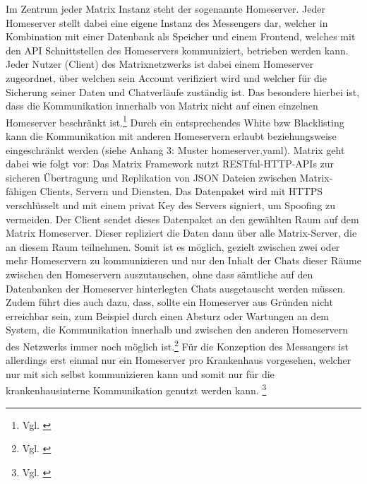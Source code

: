 Im Zentrum jeder Matrix Instanz steht der sogenannte Homeserver. Jeder Homeserver stellt dabei eine eigene Instanz des Messengers dar, welcher in Kombination mit einer Datenbank als Speicher und einem Frontend, welches mit den API Schnittstellen des Homeservers kommuniziert, betrieben werden kann. Jeder Nutzer (Client) des Matrixnetzwerks ist dabei einem Homeserver zugeordnet, über welchen sein Account verifiziert wird und welcher für die Sicherung seiner Daten und Chatverläufe zuständig ist. Das besondere hierbei ist, dass die Kommunikation innerhalb von Matrix nicht auf einen einzelnen Homeserver beschränkt ist.\footnote{Vgl. \cite{Github2020}} Durch ein entsprechendes White bzw Blacklisting kann die Kommunikation mit anderen Homeservern erlaubt beziehungsweise eingeschränkt werden (siehe Anhang 3: Muster homeserver.yaml). Matrix geht dabei wie folgt vor:
Das Matrix Framework nutzt RESTful-HTTP-APIs zur sicheren Übertragung und Replikation von JSON Dateien zwischen Matrix-fähigen Clients, Servern und Diensten. Das Datenpaket wird mit HTTPS verschlüsselt und mit einem privat Key des Servers signiert, um Spoofing zu vermeiden.
Der Client sendet dieses Datenpaket an den gewählten \glqq Raum\grqq{} auf dem Matrix Homeserver. Dieser repliziert die Daten dann über alle Matrix-Server, die an diesem \glqq Raum\grqq{} teilnehmen. Somit ist es möglich, gezielt zwischen zwei oder mehr Homeservern zu kommunizieren und nur den Inhalt der Chats dieser Räume zwischen den Homeservern auszutauschen, ohne dass sämtliche auf den Datenbanken der Homeserver hinterlegten Chats ausgetauscht werden müssen. Zudem führt dies auch dazu, dass, sollte ein Homeserver aus Gründen nicht erreichbar sein, zum Beispiel durch einen Absturz oder Wartungen an dem System, die Kommunikation innerhalb und zwischen den anderen Homeservern des Netzwerks immer noch möglich ist.\footnote{Vgl. \cite{Github2020}} Für die Konzeption des Messangers ist allerdings erst einmal nur ein Homeserver pro Krankenhaus vorgesehen, welcher nur mit sich selbst kommunizieren kann und somit nur für die krankenhausinterne Kommunikation genutzt werden kann. \footnote{Vgl. \cite{Matirx.org-specifications2020}}

